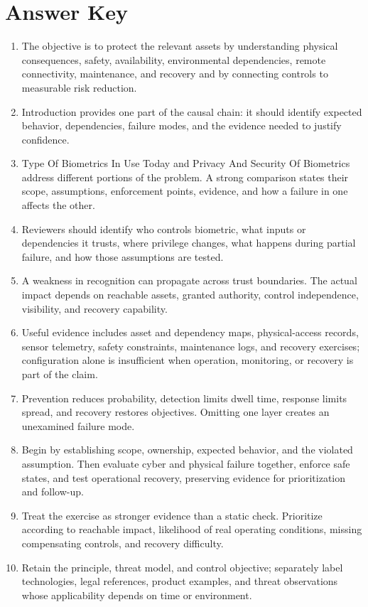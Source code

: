 \documentclass[11pt,letterpaper]{article}
\begin{document}
\section*{Answer Key}
\begin{enumerate}
\item The objective is to protect the relevant assets by understanding physical consequences, safety, availability, environmental dependencies, remote connectivity, maintenance, and recovery and by connecting controls to measurable risk reduction.
\item Introduction provides one part of the causal chain: it should identify expected behavior, dependencies, failure modes, and the evidence needed to justify confidence.
\item Type Of Biometrics In Use Today and Privacy And Security Of Biometrics address different portions of the problem. A strong comparison states their scope, assumptions, enforcement points, evidence, and how a failure in one affects the other.
\item Reviewers should identify who controls biometric, what inputs or dependencies it trusts, where privilege changes, what happens during partial failure, and how those assumptions are tested.
\item A weakness in recognition can propagate across trust boundaries. The actual impact depends on reachable assets, granted authority, control independence, visibility, and recovery capability.
\item Useful evidence includes asset and dependency maps, physical-access records, sensor telemetry, safety constraints, maintenance logs, and recovery exercises; configuration alone is insufficient when operation, monitoring, or recovery is part of the claim.
\item Prevention reduces probability, detection limits dwell time, response limits spread, and recovery restores objectives. Omitting one layer creates an unexamined failure mode.
\item Begin by establishing scope, ownership, expected behavior, and the violated assumption. Then evaluate cyber and physical failure together, enforce safe states, and test operational recovery, preserving evidence for prioritization and follow-up.
\item Treat the exercise as stronger evidence than a static check. Prioritize according to reachable impact, likelihood of real operating conditions, missing compensating controls, and recovery difficulty.
\item Retain the principle, threat model, and control objective; separately label technologies, legal references, product examples, and threat observations whose applicability depends on time or environment.
\end{enumerate}
\end{document}

